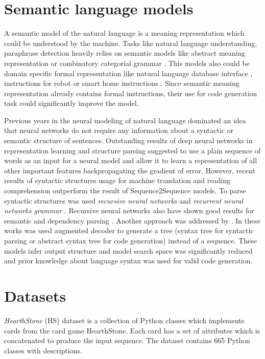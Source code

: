 \section{Semantic language models}
A semantic model of the natural language is a meaning representation which could be understood by the machine. Tasks like natural language understanding, paraphrase detection heavily relies on semantic models like abstract meaning representation \parencite{banarescu2013abstract} or combinatory categorial grammar \parencite{Clark2007}. This models also could be domain specific formal representation like natural language database interface \parencite{Zettlemoyer2012, berant2013semantic}, instructions for robot \parencite{artzi2013weakly} or smart home instructions \parencite{quirk2015language}. Since semantic meaning representation already contains formal instructions, their use for code generation task could significantly improve the model. 

Previous years in the neural modeling of natural language dominated an idea that neural networks do not require any information about a syntactic or semantic structure of sentences. Outstanding results of deep neural networks in representation learning and structure parsing suggested to use a plain sequence of words as an input for a neural model and allow it to learn a representation of all other important features backpropagating the gradient of error. However, recent results of syntactic structures usage for machine translation \parencite{Chen2017} and reading comprehension \parencite{xie2017constituent} outperform the result of Sequence2Sequence models. To parse syntactic structures was used \emph{recursive neural networks} \parencite{Goller, socher2011parsing} and \emph{recurrent neural networks grammar} \parencite{Dyer2016}. Recursive neural networks also have shown good results for semantic \parencite{Tai2015} and dependency parsing \parencite{Zhu2015}. Another approach was addressed by \cite{Dong2016, Yin2017, Rabinovich2017}. In these works was used augmented decoder to generate a tree (syntax tree for syntactic parsing or abstract syntax tree for code generation) instead of a sequence. These models infer output structure and model search space was significantly reduced and prior knowledge about language syntax was used for valid code generation.

\section{Datasets}
\emph{HearthStone} (HS) dataset \parencite{Ling2016} is a collection of Python classes which implements cards from the card game HearthStone. Each card has a set of attributes which is concatenated to produce the input sequence. The dataset contains 665 Python classes with descriptions.

